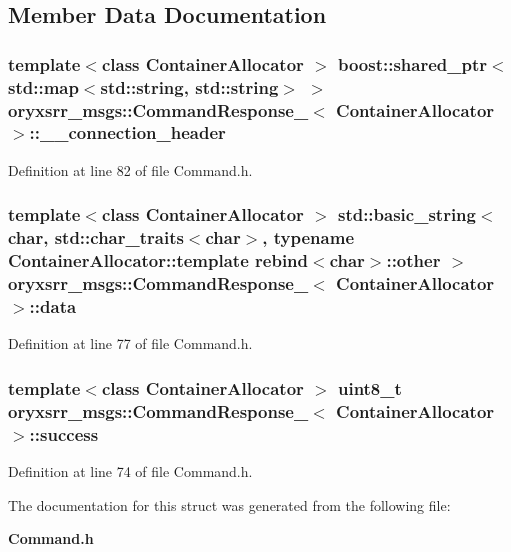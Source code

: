 \subsection{\-Member \-Data \-Documentation}
\subsubsection[{\-\_\-\-\_\-connection\-\_\-header}]{\setlength{\rightskip}{0pt plus 5cm}template$<$class Container\-Allocator $>$ boost\-::shared\-\_\-ptr$<$std\-::map$<$std\-::string, std\-::string$>$ $>$ {\bf oryxsrr\-\_\-msgs\-::\-Command\-Response\-\_\-}$<$ \-Container\-Allocator $>$\-::{\bf \-\_\-\-\_\-connection\-\_\-header}}\label{structoryxsrr__msgs_1_1CommandResponse___a80506491dad788a3d6871a78ddc41b17}


\-Definition at line 82 of file \-Command.\-h.

\subsubsection[{data}]{\setlength{\rightskip}{0pt plus 5cm}template$<$class Container\-Allocator $>$ std\-::basic\-\_\-string$<$char, std\-::char\-\_\-traits$<$char$>$, typename \-Container\-Allocator\-::template rebind$<$char$>$\-::other $>$ {\bf oryxsrr\-\_\-msgs\-::\-Command\-Response\-\_\-}$<$ \-Container\-Allocator $>$\-::{\bf data}}\label{structoryxsrr__msgs_1_1CommandResponse___a799e4755a6931769261e4a2287972b89}


\-Definition at line 77 of file \-Command.\-h.

\subsubsection[{success}]{\setlength{\rightskip}{0pt plus 5cm}template$<$class Container\-Allocator $>$ uint8\-\_\-t {\bf oryxsrr\-\_\-msgs\-::\-Command\-Response\-\_\-}$<$ \-Container\-Allocator $>$\-::{\bf success}}\label{structoryxsrr__msgs_1_1CommandResponse___a73ed7ca2242a433c4bf940bb0e87f5c8}


\-Definition at line 74 of file \-Command.\-h.



\-The documentation for this struct was generated from the following file\-:\begin{DoxyCompactItemize}
\item 
{\bf \-Command.\-h}\end{DoxyCompactItemize}
